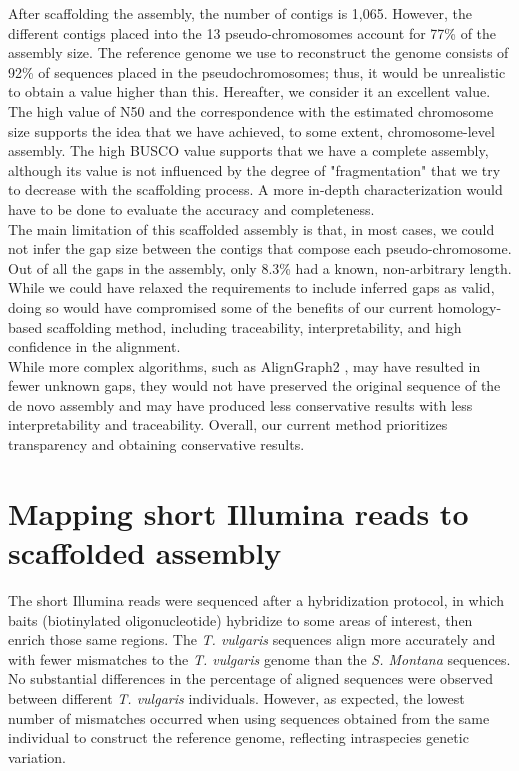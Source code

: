 After scaffolding the assembly, the number of contigs is 1,065. However, the different contigs placed into the 13 pseudo-chromosomes account for  77\% of the assembly size. The reference genome we use to reconstruct the genome consists of 92\% of sequences placed in the pseudochromosomes; thus, it would be unrealistic to obtain a value higher than this. Hereafter, we consider it an excellent value. \\

The high value of N50 and the correspondence with the estimated chromosome size supports the idea that we have achieved, to some extent, chromosome-level assembly. The high \ac{BUSCO} value supports that we have a complete assembly, although its value is not influenced by the degree of "fragmentation" that we try to decrease with the scaffolding process. A more in-depth characterization would have to be done to evaluate the accuracy and completeness.  \\

The main limitation of this scaffolded assembly is that, in most cases, we could not infer the gap size between the contigs that compose each pseudo-chromosome. Out of all the gaps in the assembly, only 8.3\% had a known, non-arbitrary length. While we could have relaxed the requirements to include inferred gaps as valid, doing so would have compromised some of the benefits of our current homology-based scaffolding method, including traceability, interpretability, and high confidence in the alignment.\\

While more complex algorithms, such as AlignGraph2 \cite{huangAlignGraph2SimilarGenomeassisted2021}, may have resulted in fewer unknown gaps, they would not have preserved the original sequence of the de novo assembly and may have produced less conservative results with less interpretability and traceability. Overall, our current method prioritizes transparency and obtaining conservative results.\\

\section{Mapping short Illumina reads to scaffolded assembly}

The short Illumina reads were sequenced after a hybridization protocol, in which baits (biotinylated oligonucleotide) hybridize to some areas of interest, then enrich those same regions. The \textit{T. vulgaris} sequences align more accurately and with fewer mismatches to the \textit{T. vulgaris} genome than the \textit{S. Montana} sequences. No substantial differences in the percentage of aligned sequences were observed between different \textit{T. vulgaris} individuals. However, as expected, the lowest number of mismatches occurred when using sequences obtained from the same individual to construct the reference genome, reflecting intraspecies genetic variation.\\

